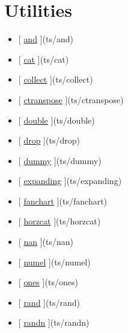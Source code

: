 \documentclass[letterpaper,10pt,english]{sphinxmanual}
\begin{document}
\section{Utilities}
\label{classes/time_series/@ts/ts:utilities}\begin{itemize}
\item {} 
{[} {\hyperref[classes/time_series/@ts/ts:and]{and}} {]}(ts/and)

\item {} 
{[} {\hyperref[classes/time_series/@ts/ts:cat]{cat}} {]}(ts/cat)

\item {} 
{[} {\hyperref[classes/time_series/@ts/ts:collect]{collect}} {]}(ts/collect)

\item {} 
{[} {\hyperref[classes/time_series/@ts/ts:ctranspose]{ctranspose}} {]}(ts/ctranspose)

\item {} 
{[} {\hyperref[classes/time_series/@ts/ts:double]{double}} {]}(ts/double)

\item {} 
{[} {\hyperref[classes/time_series/@ts/ts:drop]{drop}} {]}(ts/drop)

\item {} 
{[} {\hyperref[classes/time_series/@ts/ts:dummy]{dummy}} {]}(ts/dummy)

\item {} 
{[} {\hyperref[classes/time_series/@ts/ts:expanding]{expanding}} {]}(ts/expanding)

\item {} 
{[} {\hyperref[classes/time_series/@ts/ts:fanchart]{fanchart}} {]}(ts/fanchart)

\item {} 
{[} {\hyperref[classes/time_series/@ts/ts:horzcat]{horzcat}} {]}(ts/horzcat)

\item {} 
{[} {\hyperref[classes/time_series/@ts/ts:nan]{nan}} {]}(ts/nan)

\item {} 
{[} {\hyperref[classes/time_series/@ts/ts:numel]{numel}} {]}(ts/numel)

\item {} 
{[} {\hyperref[classes/time_series/@ts/ts:ones]{ones}} {]}(ts/ones)

\item {} 
{[} {\hyperref[classes/time_series/@ts/ts:rand]{rand}} {]}(ts/rand)

\item {} 
{[} {\hyperref[classes/time_series/@ts/ts:randn]{randn}} {]}(ts/randn)


\end{itemize}
\end{document}
